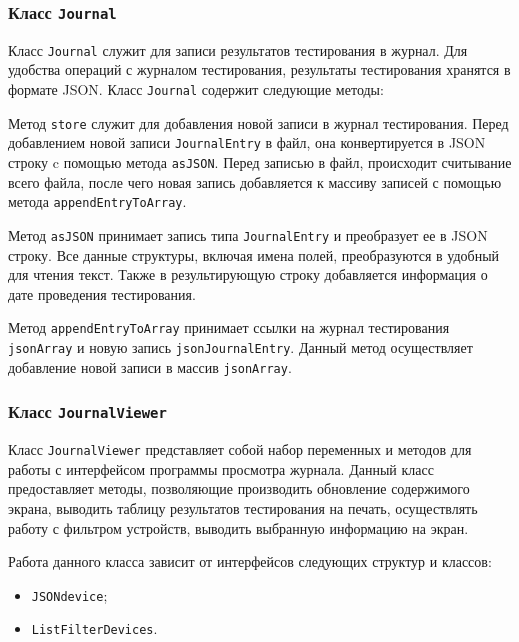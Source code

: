 \subsubsection{Класс \texttt{Journal}}
Класс \texttt{Journal} служит для записи результатов тестирования в журнал. Для удобства операций с журналом
тестирования, результаты тестирования хранятся в формате JSON. Класс \texttt{Journal} содержит следующие методы:
\begin{enum}
	\item Метод \texttt{store} служит для добавления новой записи в журнал тестирования. Перед добавлением новой
		записи \texttt{JournalEntry} в файл, она конвертируется в JSON строку c помощью метода \texttt{asJSON}.
		Перед записью в файл, происходит считывание всего файла, после чего новая запись добавляется к массиву
		записей с помощью метода \texttt{appendEntryToArray}.

	\item Метод \texttt{asJSON} принимает запись типа \texttt{JournalEntry} и преобразует ее в JSON строку.
		Все данные структуры, включая имена полей, преобразуются в удобный для чтения текст. Также в
		результирующую строку добавляется информация о дате проведения тестирования.

	\item Метод \texttt{appendEntryToArray} принимает ссылки на журнал тестирования \texttt{jsonArray} и новую
		запись \texttt{jsonJournalEntry}. Данный метод осуществляет добавление новой записи в массив
		\texttt{jsonArray}.
\end{enum}

\subsubsection{Класс \texttt{JournalViewer}}
Класс \texttt{JournalViewer} представляет собой набор переменных и методов для работы с интерфейсом программы просмотра
журнала. Данный класс предоставляет методы, позволяющие производить обновление содержимого экрана, выводить таблицу
результатов тестирования на печать, осуществлять работу с фильтром устройств, выводить выбранную информацию на экран.

Работа данного класса зависит от интерфейсов следующих структур и классов:
\begin{itemize}
	\item \texttt{JSONdevice};
	\item \texttt{ListFilterDevices}.
\end{itemize}

